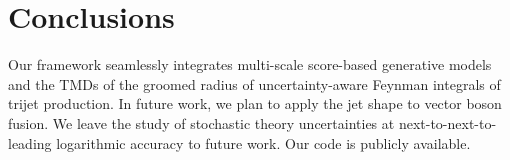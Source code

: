 \section{Conclusions}\label{sec:conclusions}

Our framework seamlessly integrates multi-scale score-based generative
models and the TMDs of the groomed radius of uncertainty-aware Feynman
integrals of trijet production. In future work, we plan to apply the jet
shape to vector boson fusion. We leave the study of stochastic theory
uncertainties at next-to-next-to-leading logarithmic accuracy to future
work. Our code is publicly available.

